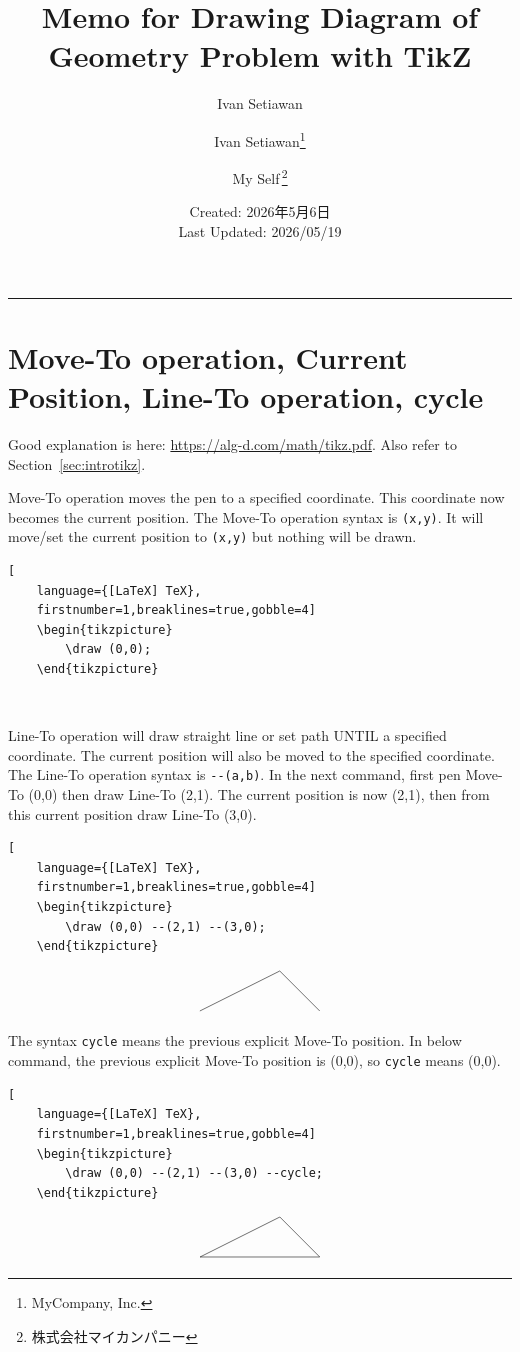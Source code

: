 \documentclass[lualatex]{jlreq}
\title{\bfseries {\huge Memo for Drawing Diagram of Geometry Problem with TikZ}}
\author{\LARGE Ivan Setiawan}
\author{{\LARGE Ivan Setiawan\thanks{MyCompany, Inc.}} \and {\LARGE My Self\,\thanks{株式会社マイカンパニー}}}
\date{Created: 2026年5月6日\\[0.3em]Last Updated: 2026/05/19}
\begin{document}
\maketitle
\hrule

\section{Move-To operation, Current Position, Line-To operation, cycle}

Good explanation is here: \url{https://alg-d.com/math/tikz.pdf}. Also refer to Section~\ref{sec:introtikz}.

Move-To operation moves the pen to a specified coordinate. This coordinate now becomes the current position. The Move-To operation syntax is \verb|(x,y)|. It will move/set the current position to \verb|(x,y)| but nothing will be drawn.
\begin{lstlisting}[
    language={[LaTeX] TeX},
    firstnumber=1,breaklines=true,gobble=4]
    \begin{tikzpicture}
        \draw (0,0);
    \end{tikzpicture}
\end{lstlisting}
\[
    \begin{tikzpicture}
        \draw (0,0);
    \end{tikzpicture}
\]

Line-To operation will draw straight line or set path UNTIL a specified coordinate. The current position will also be moved to the specified coordinate. The Line-To operation syntax is \verb|--(a,b)|. In the next command, first pen Move-To (0,0) then draw Line-To (2,1). The current position is now (2,1), then from this current position draw Line-To (3,0).
\begin{lstlisting}[
    language={[LaTeX] TeX},
    firstnumber=1,breaklines=true,gobble=4]
    \begin{tikzpicture}
        \draw (0,0) --(2,1) --(3,0);
    \end{tikzpicture}
\end{lstlisting}
\[
    \begin{tikzpicture}
        \draw (0,0) --(2,1) --(3,0);
    \end{tikzpicture}
\]

The syntax \verb|cycle| means the previous explicit Move-To position. In below command, the previous explicit Move-To position is (0,0), so \verb|cycle| means (0,0).
\begin{lstlisting}[
    language={[LaTeX] TeX},
    firstnumber=1,breaklines=true,gobble=4]
    \begin{tikzpicture}
        \draw (0,0) --(2,1) --(3,0) --cycle;
    \end{tikzpicture}
\end{lstlisting}
\[
    \begin{tikzpicture}
        \draw (0,0) --(2,1) --(3,0) --cycle;
    \end{tikzpicture}
\]
\end{document}
